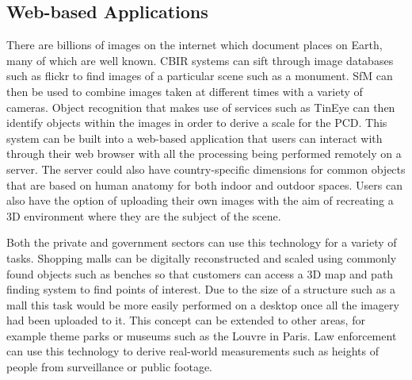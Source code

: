 \subsection{Web-based Applications}

There are billions of images on the internet which document places on Earth, many of which are well known. CBIR systems can sift through image databases such as flickr to find images of a particular scene such as a monument. SfM can then be used to combine images taken at different times with a variety of cameras. Object recognition that makes use of services such as TinEye can then identify objects within the images in order to derive a scale for the PCD. This system can be built into a web-based application that users can interact with through their web browser with all the processing being performed remotely on a server. The server could also have country-specific dimensions for common objects that are based on human anatomy for both indoor and outdoor spaces.  Users can also have the option of uploading their own images with the aim of recreating a 3D environment where they are the subject of the scene.

Both the private and government sectors can use this technology for a variety of tasks. Shopping malls can be digitally reconstructed and scaled using commonly found objects such as benches so that customers can access a 3D map and path finding system to find points of interest. Due to the size of a structure such as a mall this task would be more easily performed on a desktop once all the imagery had been uploaded to it. This concept can be extended to other areas, for example theme parks or museums such as the Louvre in Paris. Law enforcement can use this technology to derive real-world measurements such as heights of people from surveillance or public footage.

